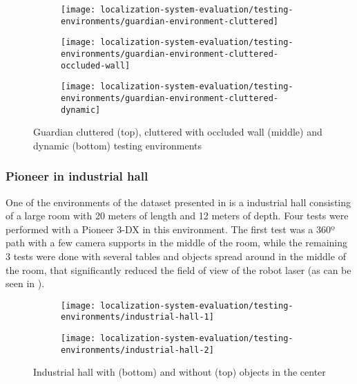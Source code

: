 \begin{figure}[H]
	\centering
	\begin{subfigure}[ht]{0.44\textwidth}
		\centering
		\texttt{[image: localization-system-evaluation/testing-environments/guardian-environment-cluttered]}
	\end{subfigure}
	\begin{subfigure}[ht]{0.44\textwidth}
		\centering
		\texttt{[image: localization-system-evaluation/testing-environments/guardian-environment-cluttered-occluded-wall]}
	\end{subfigure}
	\begin{subfigure}[ht]{0.44\textwidth}
		\centering
		\texttt{[image: localization-system-evaluation/testing-environments/guardian-environment-cluttered-dynamic]}
	\end{subfigure}
	\caption{Guardian cluttered (top), cluttered with occluded wall (middle) and dynamic (bottom) testing environments}
	\label{fig:localization-system-evaluation_guardian-tests-environment-cluttered}
\end{figure}



\subsubsection{Pioneer in industrial hall}

One of the environments of the dataset presented in \cite{Sturm2012} is a industrial hall consisting of a large room with 20 meters of length and 12 meters of depth. Four tests were performed with a Pioneer 3-DX in this environment. The first test was a 360º path with a few camera supports in the middle of the room, while the remaining 3 tests were done with several tables and objects spread around in the middle of the room, that significantly reduced the field of view of the robot laser (as can be seen in ).

\begin{figure}[H]
	\centering
	\begin{subfigure}[ht]{0.37\textwidth}
		\centering
		\texttt{[image: localization-system-evaluation/testing-environments/industrial-hall-1]}
	\end{subfigure}
	\begin{subfigure}[ht]{0.37\textwidth}
		\centering
		\texttt{[image: localization-system-evaluation/testing-environments/industrial-hall-2]}
	\end{subfigure}
	\caption{Industrial hall with (bottom) and without (top) objects in the center \cite{Sturm2012}}
	\label{fig:localization-system-evaluation_industrial-hall}
\end{figure}



